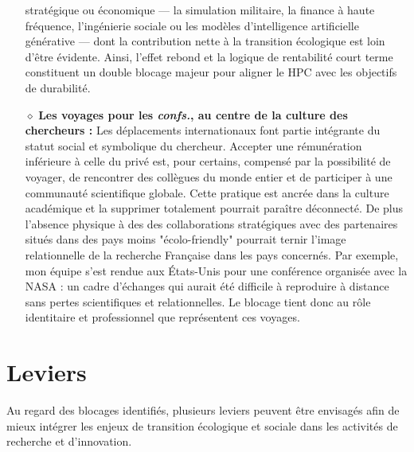 \documentclass[11pt,a4paper]{article}
\begin{document}
\begin{itemize}
          stratégique ou économique — la simulation militaire, la finance à haute fréquence, l’ingénierie sociale ou les modèles 
          d’intelligence artificielle générative — dont la contribution nette à la transition écologique est loin d’être évidente. 
          Ainsi, l’effet rebond et la logique de rentabilité court terme constituent un double blocage majeur pour aligner le HPC 
          avec les objectifs de durabilité.
        \item[$\diamond$]\textbf{Les voyages pour les \textit{confs.}, au centre de la culture des chercheurs :}
          Les déplacements internationaux font partie intégrante du statut social et symbolique du chercheur. 
          Accepter une rémunération inférieure à celle du privé est, pour certains, compensé par la possibilité de voyager, 
          de rencontrer des collègues du monde entier et de participer à une communauté scientifique globale. 
          Cette pratique est ancrée dans la culture académique et la supprimer totalement pourrait paraître déconnecté.
          De plus l’absence physique à des des collaborations stratégiques avec des partenaires situés dans des 
          pays moins "écolo-friendly" pourrait ternir l'image relationnelle de la recherche Française dans les pays concernés. 
          Par exemple, mon équipe s’est rendue aux États-Unis pour une conférence organisée avec la NASA : un cadre d’échanges qui 
          aurait été difficile à reproduire à distance sans pertes scientifiques et relationnelles. 
          Le blocage tient donc au rôle identitaire et professionnel que représentent ces voyages.
      \end{itemize}
  \section{Leviers}
  Au regard des blocages identifiés, plusieurs leviers peuvent être envisagés afin de mieux intégrer les enjeux de transition 
  écologique et sociale dans les activités de recherche et d’innovation.
\end{document}
